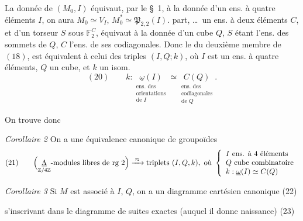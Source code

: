 \documentclass[11pt,a4paper]{article}
\begin{document}
La donnée de $(M_0, I)$ équivaut, par le §~1, à la donnée d'un ens. à quatre éléments $I$, on aura $M_0 \simeq V_I$, $M_0^* \simeq \mathfrak{P}_{2,2}(I)$.   part,  \ldots\ un ens. à deux éléments $C$, et d'un torseur $S$ sous $\mathbb{F}_2^C$, équivaut à la donnée d'un cube $Q$, $S$ étant l'ens. des sommets de $Q$, $C$ l'ens. de ses codiagonales. Donc le   du deuxième membre de $(18)$, est équivalent à celui des triples $(I, Q; k)$, où $I$ est un ens. à quatre éléments, $Q$ un cube, et $k$ un isom.
\[
  (20) \qquad k : \underset{\substack{\text{ens. des}\\ \text{orientations}\\ \text{de } I}}{\underline{\omega}(I)} \simeq \underset{\substack{\text{ens. des}\\ \text{codiagonales}\\ \text{de } Q}}{C(Q)} .
\]

On trouve donc

\emph{Corollaire 2} On a une équivalence canonique de groupoïdes
\[
  (21) \qquad
  \Bigl( \underset{\mathbb{Z}/4\mathbb{Z}}{\underline{\Lambda}}\text{-modules libres de rg } 2 \Bigr)
  \xrightarrow{\;\approx\;}
  \text{triplets } (I, Q, k), \ \text{où}\
  \left\{
  \begin{array}{l}
    I \ \text{ens. à 4 éléments} \\
    Q \ \text{cube combinatoire} \\
    k : \underline{\omega}(I) \simeq C(Q)
  \end{array}
  \right.
\]

\emph{Corollaire 3} Si $M$ est associé à $I$, $Q$, on a un diagramme cartésien canonique
(22)




s'inscrivant dans le diagramme de suites exactes (auquel il donne naissance)
(23)
\end{document}
